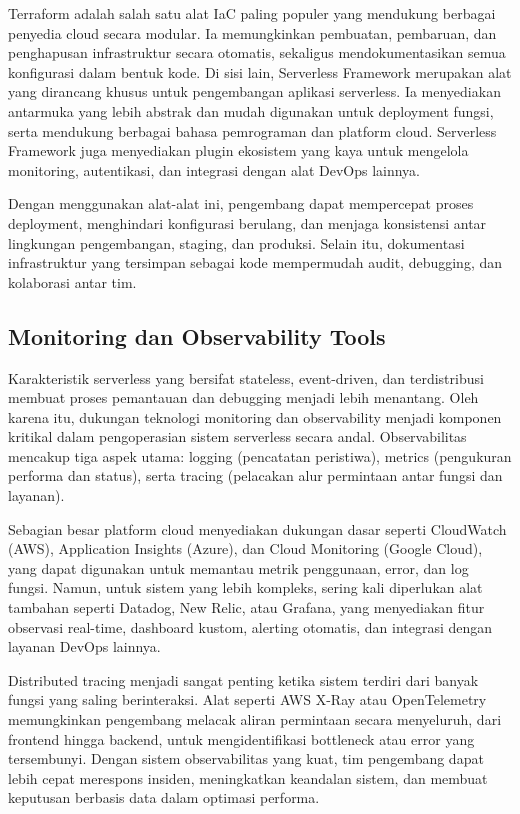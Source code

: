 Terraform adalah salah satu alat IaC paling populer yang mendukung berbagai penyedia cloud secara modular. Ia memungkinkan pembuatan, pembaruan, dan penghapusan infrastruktur secara otomatis, sekaligus mendokumentasikan semua konfigurasi dalam bentuk kode. Di sisi lain, Serverless Framework merupakan alat yang dirancang khusus untuk pengembangan aplikasi serverless. Ia menyediakan antarmuka yang lebih abstrak dan mudah digunakan untuk deployment fungsi, serta mendukung berbagai bahasa pemrograman dan platform cloud. Serverless Framework juga menyediakan plugin ekosistem yang kaya untuk mengelola monitoring, autentikasi, dan integrasi dengan alat DevOps lainnya.

Dengan menggunakan alat-alat ini, pengembang dapat mempercepat proses deployment, menghindari konfigurasi berulang, dan menjaga konsistensi antar lingkungan pengembangan, staging, dan produksi. Selain itu, dokumentasi infrastruktur yang tersimpan sebagai kode mempermudah audit, debugging, dan kolaborasi antar tim.

\subsection{Monitoring dan Observability Tools}

Karakteristik serverless yang bersifat stateless, event-driven, dan terdistribusi membuat proses pemantauan dan debugging menjadi lebih menantang. Oleh karena itu, dukungan teknologi monitoring dan observability menjadi komponen kritikal dalam pengoperasian sistem serverless secara andal. Observabilitas mencakup tiga aspek utama: logging (pencatatan peristiwa), metrics (pengukuran performa dan status), serta tracing (pelacakan alur permintaan antar fungsi dan layanan).

Sebagian besar platform cloud menyediakan dukungan dasar seperti CloudWatch (AWS), Application Insights (Azure), dan Cloud Monitoring (Google Cloud), yang dapat digunakan untuk memantau metrik penggunaan, error, dan log fungsi. Namun, untuk sistem yang lebih kompleks, sering kali diperlukan alat tambahan seperti Datadog, New Relic, atau Grafana, yang menyediakan fitur observasi real-time, dashboard kustom, alerting otomatis, dan integrasi dengan layanan DevOps lainnya.

Distributed tracing menjadi sangat penting ketika sistem terdiri dari banyak fungsi yang saling berinteraksi. Alat seperti AWS X-Ray atau OpenTelemetry memungkinkan pengembang melacak aliran permintaan secara menyeluruh, dari frontend hingga backend, untuk mengidentifikasi bottleneck atau error yang tersembunyi. Dengan sistem observabilitas yang kuat, tim pengembang dapat lebih cepat merespons insiden, meningkatkan keandalan sistem, dan membuat keputusan berbasis data dalam optimasi performa.



